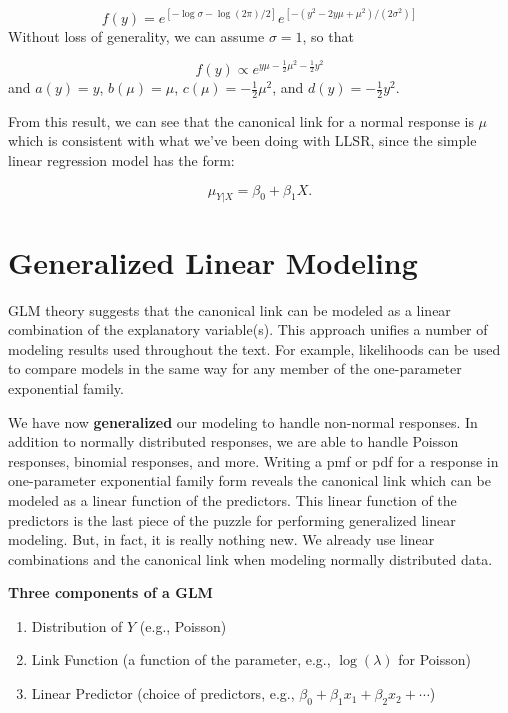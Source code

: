 \documentclass[
]{krantz}
\providecommand{\tightlist}{%
  \setlength{\itemsep}{0pt}\setlength{\parskip}{0pt}}
\begin{document}
\[
f(y)=e^{[-\log{\sigma}-\log(2\pi)/2]}{e^{[-{(y^2-2y\mu +\mu^2)}/{(2\sigma^2)}]}}
\]
Without loss of generality, we can assume \(\sigma=1\), so that

\[
f(y) \propto e^{y\mu - \frac{1}{2} \mu^2 - \frac{1}{2} y^2}
\]
and \(a(y)=y\), \(b(\mu)=\mu\), \(c(\mu)= -\frac{1}{2}\mu^2\), and \(d(y) = - \frac{1}{2} y^2\).

From this result, we can see that the canonical link for a normal response is \(\mu\) which is consistent with what we've been doing with LLSR, since the simple linear regression model has the form:

\[ \mu_{Y|X} = \beta_0 + \beta_1X. \]

\hypertarget{generalized-linear-modeling}{%
\section{Generalized Linear Modeling}\label{generalized-linear-modeling}}

GLM theory suggests that the canonical link can be modeled as a linear combination of the explanatory variable(s). This approach unifies a number of modeling results used throughout the text. For example, likelihoods can be used to compare models in the same way for any member of the one-parameter exponential family.

We have now \textbf{generalized} our modeling to handle non-normal responses. In addition to normally distributed responses, we are able to handle Poisson responses, binomial responses, and more. Writing a pmf or pdf for a response in one-parameter exponential family form reveals the canonical link which can be modeled as a linear function of the predictors. This linear function of the predictors is the last piece of the puzzle for performing generalized linear modeling. But, in fact, it is really nothing new. We already use linear combinations and the canonical link when modeling normally distributed data.

\textbf{Three components of a GLM}

\begin{enumerate}
\def\labelenumi{\arabic{enumi}.}
\tightlist
\item
  Distribution of \(Y\) (e.g., Poisson)
\item
  Link Function (a function of the parameter, e.g., \(\log(\lambda)\) for Poisson)
\item
  Linear Predictor (choice of predictors,
  e.g., \(\beta_0 + \beta_1 x_1 + \beta_2 x_2 + \cdots\))
\end{enumerate}
\end{document}
